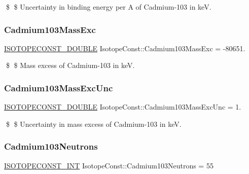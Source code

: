 \$ \$ Uncertainty in binding energy per A of Cadmium-\/103 in keV. \mbox{\label{group___isotope_const-_cadmium-_cd103_gaf34b1ba0488e719d82382b484ffb6f6c}} 
\subsubsection{\texorpdfstring{Cadmium103\+Mass\+Exc}{Cadmium103MassExc}}
{\footnotesize\ttfamily \mbox{\hyperlink{group___isotope_const-_macros_ga8f45a7272ce02c0b4c65c44636ed719a}{I\+S\+O\+T\+O\+P\+E\+C\+O\+N\+S\+T\+\_\+\+D\+O\+U\+B\+LE}} Isotope\+Const\+::\+Cadmium103\+Mass\+Exc = -\/80651.}

\$ \$ Mass excess of Cadmium-\/103 in keV. \mbox{\label{group___isotope_const-_cadmium-_cd103_ga76957e678a50ad5592e2fe4e24b5d08e}} 
\subsubsection{\texorpdfstring{Cadmium103\+Mass\+Exc\+Unc}{Cadmium103MassExcUnc}}
{\footnotesize\ttfamily \mbox{\hyperlink{group___isotope_const-_macros_ga8f45a7272ce02c0b4c65c44636ed719a}{I\+S\+O\+T\+O\+P\+E\+C\+O\+N\+S\+T\+\_\+\+D\+O\+U\+B\+LE}} Isotope\+Const\+::\+Cadmium103\+Mass\+Exc\+Unc = 1.}

\$ \$ Uncertainty in mass excess of Cadmium-\/103 in keV. \mbox{\label{group___isotope_const-_cadmium-_cd103_gab14dd4aea3a39bd531bf140446fb8ac5}} 
\subsubsection{\texorpdfstring{Cadmium103\+Neutrons}{Cadmium103Neutrons}}
{\footnotesize\ttfamily \mbox{\hyperlink{group___isotope_const-_macros_ga5f18360b3e99483a35c32d789e62621c}{I\+S\+O\+T\+O\+P\+E\+C\+O\+N\+S\+T\+\_\+\+I\+NT}} Isotope\+Const\+::\+Cadmium103\+Neutrons = 55}

